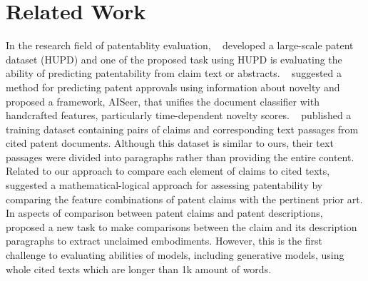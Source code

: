 \section{Related Work}
In the research field of patentablity evaluation, ~\citet{suzgun2024harvard} developed a large-scale patent dataset (HUPD) and one of the proposed task using HUPD is evaluating the ability of predicting patentability from claim text or abstracts. ~\citet{gao2022towards} suggested a method for predicting patent approvals using information about novelty and proposed a framework, AISeer, that unifies the document classifier with handcrafted features, particularly time-dependent novelty scores. ~\citet{risch2020patentmatch} published a training dataset containing pairs of claims and corresponding text passages from cited patent documents. Although this dataset is similar to ours, their text passages were divided into paragraphs rather than providing the entire content. Related to our approach to compare each element of claims to cited texts, ~\citet{schmitt2023assessment} suggested a mathematical-logical approach for assessing patentability by comparing the feature combinations of patent claims with the pertinent prior art. In aspects of comparison between patent claims and patent descriptions, ~\citet{hashimoto2023hunt} proposed a new task to make comparisons between the claim and its description paragraphs to extract unclaimed embodiments. However, this is the first challenge to evaluating abilities of models, including generative models, using whole cited texts which are longer than 1k amount of words.